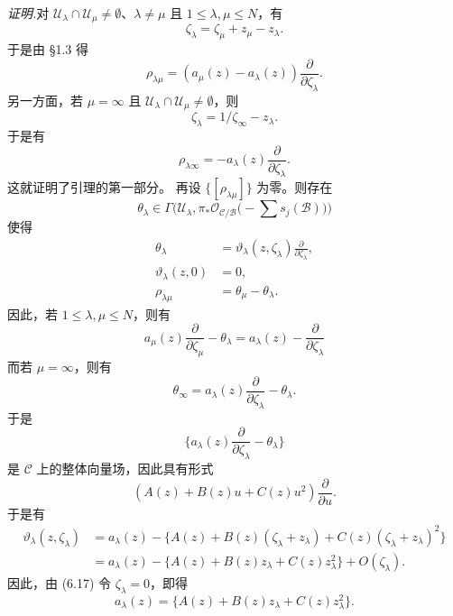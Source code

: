 \noindent\textit{证明.}\quad 对 $\mathcal{U}_\lambda\cap\mathcal{U}_\mu\ne\emptyset$、$\lambda\ne\mu$ 且 $1\le\lambda,\mu\le N$，有
\[
\zeta_\lambda=\zeta_\mu+z_\mu-z_\lambda.
\]
于是由 §1.3 得
\[
\rho_{\lambda\mu}=(a_\mu(z)-a_\lambda(z))\frac{\partial}{\partial\zeta_\lambda}.
\]
另一方面，若 $\mu=\infty$ 且 $\mathcal{U}_\lambda\cap\mathcal{U}_\mu\ne\emptyset$，则
\[
\zeta_\lambda=1/\zeta_\infty-z_\lambda.
\]
于是有
\[
\rho_{\lambda\infty}=-a_\lambda(z)\frac{\partial}{\partial\zeta_\lambda}.
\]
这就证明了引理的第一部分。
再设 $\{[\rho_{\lambda\mu}]\}$ 为零。则存在
\[
\theta_\lambda\in\Gamma\Big(\mathcal{U}_\lambda,\pi_*\mathcal{O}_{\mathcal{C}/\mathcal{B}}\Big(-\sum s_j(\mathcal{B})\Big)\Big)
\]
使得
\begin{align}
\theta_\lambda&=\vartheta_\lambda(z,\zeta_\lambda)\frac{\partial}{\partial\zeta_\lambda},\nonumber\\
\vartheta_\lambda(z,0)&=0,\nonumber\\
\rho_{\lambda\mu}&=\theta_\mu-\theta_\lambda.\tag{6.17}
\end{align}
因此，若 $1\le\lambda,\mu\le N$，则有
\[
a_\mu(z)\frac{\partial}{\partial\zeta_\mu}-\theta_\lambda=a_\lambda(z)-\frac{\partial}{\partial\zeta_\lambda}
\]
而若 $\mu=\infty$，则有
\[
\theta_\infty=a_\lambda(z)\frac{\partial}{\partial\zeta_\lambda}-\theta_\lambda.
\]
于是
\[
\Big\{a_\lambda(z)\frac{\partial}{\partial\zeta_\lambda}-\theta_\lambda\Big\}
\]
是 $\mathcal{C}$ 上的整体向量场，因此具有形式
\[
(A(z)+B(z)u+C(z)u^2)\frac{\partial}{\partial u}.
\]
于是有
\begin{align*}
\vartheta_\lambda(z,\zeta_\lambda)&=a_\lambda(z)-\{A(z)+B(z)(\zeta_\lambda+z_\lambda)+C(z)(\zeta_\lambda+z_\lambda)^2\}\\
&=a_\lambda(z)-\{A(z)+B(z)z_\lambda+C(z)z_\lambda^2\}+O(\zeta_\lambda).
\end{align*}
因此，由 (6.17) 令 $\zeta_\lambda=0$，即得
\[
a_\lambda(z)=\{A(z)+B(z)z_\lambda+C(z)z_\lambda^2\}.
\]
